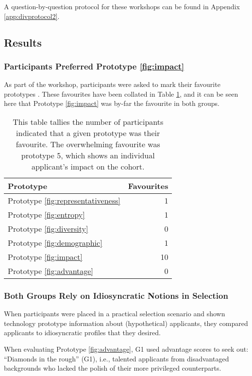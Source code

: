 A question-by-question protocol for these workshops can be found in Appendix \ref{app:divprotocol2}.

\subsection{Results}\label{ssec:results2}
\subsubsection{Participants Preferred Prototype \ref{fig:impact}}
As part of the workshop, participants were asked to mark their favourite prototypes \cite{Gatian_1994,Griffiths_Johnson_Hartley_2007}. These favourites have been collated in Table \ref{tab:favourites}, and it can be seen here that Prototype \ref{fig:impact} was by-far the favourite in both groups.

\begin{table}[htbp]
    \centering
    \caption{This table tallies the number of participants indicated that a given prototype was their favourite. The overwhelming favourite was prototype 5, which shows an individual applicant's impact on the cohort.}
    \label{tab:favourites}
    \begin{tabular}{lr}
        \toprule
        \textbf{Prototype} & \textbf{Favourites} \\
        \midrule
        Prototype \ref{fig:representativeness} & 1 \\
        Prototype \ref{fig:entropy} & 1 \\
        Prototype \ref{fig:diversity} & 0 \\
        Prototype \ref{fig:demographic} & 1 \\
        Prototype \ref{fig:impact} & 10 \\
        Prototype \ref{fig:advantage} & 0 \\
        \bottomrule
    \end{tabular}
\end{table}

\subsubsection{Both Groups Rely on Idiosyncratic Notions in Selection}
When participants were placed in a practical selection scenario and shown technology prototype information about (hypothetical) applicants, they compared applicants to idiosyncratic profiles that they desired.

When evaluating Prototype \ref{fig:advantage}, G1 used advantage scores to seek out: ``Diamonds in the rough'' (G1), i.e., talented applicants from disadvantaged backgrounds who lacked the polish of their more privileged counterparts.

